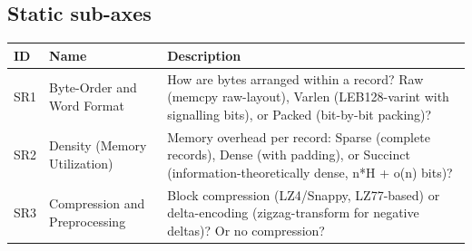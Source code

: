 \subsection*{Static sub-axes}
\begin{scriptsize}
\begin{longtable}{@{}>{\raggedright\arraybackslash}p{1.8cm} >{\raggedright\arraybackslash}p{3.2cm} >{\raggedright\arraybackslash}p{8.5cm}@{}}
\toprule
ID & Name & Description \\
\midrule
\endhead%
SR1 & Byte-Order and Word Format & How are bytes arranged within a record? Raw (memcpy raw-layout), Varlen (LEB128-varint with signalling bits), or Packed (bit-by-bit packing)? \\
SR2 & Density (Memory Utilization) & Memory overhead per record: Sparse (complete records), Dense (with padding), or Succinct (information-theoretically dense, n*H + o(n) bits)? \\
SR3 & Compression and Preprocessing & Block compression (LZ4/\allowbreak{}Snappy, LZ77-based) or delta-encoding (zigzag-transform for negative deltas)? Or no compression? \\
\bottomrule
\end{longtable}
\end{scriptsize}

